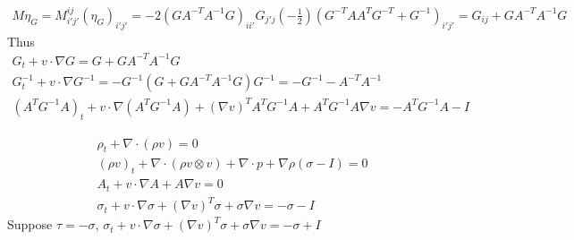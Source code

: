 \documentclass{article}
\begin{document}
\begin{eqnarray*}
M \eta_G = M_{i'j'}^{ij} (\eta_{G})_{i'j'} =  -2 (GA^{-T}A^{-1} G)_{ii'} G_{j'j} (-\frac{1}{2}) (G^{-T}A A^T G^{-T} + G^{-1})_{i'j'} = G_{ij} + GA^{-T}A^{-1} G
\end{eqnarray*}
Thus
\begin{eqnarray*}
G_t + v \cdot \nabla G  = G + G A^{-T} A^{-1} G \\
G^{-1}_t + v \cdot \nabla G^{-1}  =-G^{-1}( G + G A^{-T} A^{-1} G )G^{-1} = -G^{-1} - A^{-T}A^{-1}  \\
(A^T G^{-1} A)_t +  v \cdot \nabla (A^T G^{-1} A) + (\nabla v)^T A^T G^{-1} A + A^T G^{-1} A \nabla v= - A^T G^{-1} A - I
\end{eqnarray*}

\begin{subequations}
\begin{align}
\rho_t + \nabla \cdot (\rho v )=0 \\
(\rho v)_t + \nabla \cdot (\rho v \otimes v) + \nabla \cdot p + \nabla \rho( \sigma -I) = 0 \\
A_t + v \cdot \nabla A + A \nabla v = 0 \\
\sigma_t + v \cdot \nabla   \sigma + (\nabla v)^T \sigma +  \sigma \nabla v = -\sigma - I
\end{align}
\end{subequations}
Suppose $\tau = - \sigma$, $ \sigma_t + v \cdot \nabla   \sigma + (\nabla v)^T \sigma +  \sigma \nabla v  = -\sigma +I$
\end{document}
